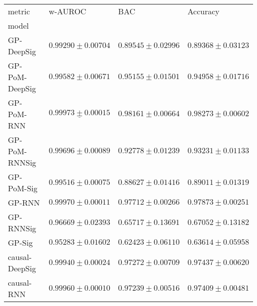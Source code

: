 \begin{tabular}{llll}
\toprule
metric &                                           w-AUROC &                                               BAC &                                          Accuracy \\
model          &                                                   &                                                   &                                                   \\
\midrule
GP-DeepSig     &                           $ 0.99290 \pm 0.00704 $ &                           $ 0.89545 \pm 0.02996 $ &                           $ 0.89368 \pm 0.03123 $ \\
GP-PoM-DeepSig &                           $ 0.99582 \pm 0.00671 $ &                           $ 0.95155 \pm 0.01501 $ &                           $ 0.94958 \pm 0.01716 $ \\
GP-PoM-RNN     &            $  \underline{ 0.99973 \pm 0.00015 } $ &               $  \mathbf{ 0.98161 \pm 0.00664 } $ &               $  \mathbf{ 0.98273 \pm 0.00602 } $ \\
GP-PoM-RNNSig  &                           $ 0.99696 \pm 0.00089 $ &                           $ 0.92778 \pm 0.01239 $ &                           $ 0.93231 \pm 0.01133 $ \\
GP-PoM-Sig     &                           $ 0.99516 \pm 0.00075 $ &                           $ 0.88627 \pm 0.01416 $ &                           $ 0.89011 \pm 0.01319 $ \\
GP-RNN         &                           $ 0.99970 \pm 0.00011 $ &                           $ 0.97712 \pm 0.00266 $ &                           $ 0.97873 \pm 0.00251 $ \\
GP-RNNSig      &                           $ 0.96669 \pm 0.02393 $ &                           $ 0.65717 \pm 0.13691 $ &                           $ 0.67052 \pm 0.13182 $ \\
GP-Sig         &                           $ 0.95283 \pm 0.01602 $ &                           $ 0.62423 \pm 0.06110 $ &                           $ 0.63614 \pm 0.05958 $ \\
causal-DeepSig &                           $ 0.99940 \pm 0.00024 $ &                           $ 0.97272 \pm 0.00709 $ &                           $ 0.97437 \pm 0.00620 $ \\
causal-RNN     &                           $ 0.99960 \pm 0.00010 $ &                           $ 0.97239 \pm 0.00516 $ &                           $ 0.97409 \pm 0.00481 $ \\

\end{tabular}
